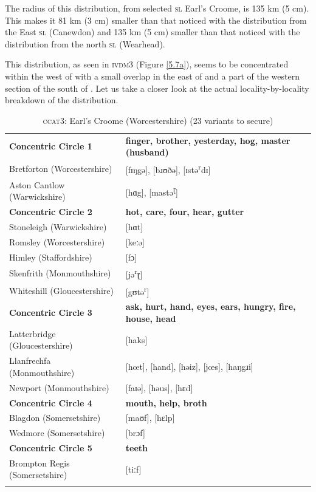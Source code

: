 The radius of this distribution, from selected \textsc{sl} Earl's Croome, is 135 km (5 cm). This makes it 81 km (3 cm) smaller than that noticed with the distribution from the East  \textsc{sl} (Canewdon) and 135 km (5 cm) smaller than that noticed with the distribution from the north  \textsc{sl} (Wearhead).


This distribution, as seen in \textsc{ivdm3} (Figure \ref{5.7a}), seems to be concentrated within the west of  with a small overlap in the east of  and a part of the western section of the south of . Let us take a closer look at the actual locality-by-locality breakdown of the distribution.
 

\begin{table}
\begin{tabularx}{\textwidth}{lX}
\lsptoprule 
\textbf{Concentric Circle 1} & \textbf{finger, brother, yesterday, hog, master (husband)} \\  
Bretforton (Worcestershire) & [fɪŋgə], [bɹʊðə], [ɪstə\textsuperscript{r}dɪ]  \\
Aston Cantlow (Warwickshire) &  [hɑg], [mastə\textsuperscript{ɽ}]  \\
\midrule\textbf{Concentric Circle 2} & \textbf{hot, care, four, hear, gutter} \\
Stoneleigh (Warwickshire) & [hɑt]  \\
Romsley (Worcestershire) &  [keːə]\\
Himley (Staffordshire) &  [fɔ] \\
Skenfrith (Monmouthshire) &  [jə\textsuperscript{r}ɽ] \\
Whiteshill (Gloucestershire) &  [gʊtə\textsuperscript{r}] \\
\midrule\textbf{Concentric Circle 3} & \textbf{ask, hurt, hand, eyes, ears, hungry, fire, house, head}\\
Latterbridge (Gloucestershire) & [haks] \\
Llanfrechfa (Monmouthshire) & [hœt], [hand], [həiz], [jœs], [haŋgɹi] \\
Newport (Monmouthshire) & [faɪə], [həus], [hɛd]  \\
\midrule\textbf{Concentric Circle 4} & \textbf{mouth, help, broth}\\
Blagdon (Somersetshire) & [maʊf], [hɛlp] \\
Wedmore  (Somersetshire) & [brɔf] \\
\midrule\textbf{Concentric Circle 5} & \textbf{teeth}\\
Brompton Regis (Somersetshire) & [tiːf]  \\
\lspbottomrule 
\end{tabularx}
\caption{\textsc{ccat3}: Earl's Croome (Worcestershire)  (23 variants to secure)}
\label{Table 5.4}
\end{table}

